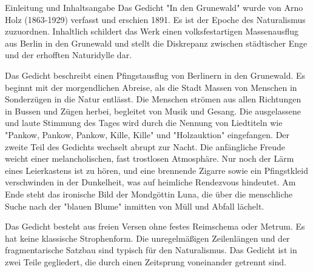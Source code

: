 \documentclass[11pt,a4paper,oneside]{article}
\begin{document}
	\begin{loesung}{Einleitung und Inhaltsangabe}
		Das Gedicht "In den Grunewald" wurde von Arno Holz (1863-1929) verfasst und erschien 1891. Es ist der Epoche des Naturalismus zuzuordnen. Inhaltlich schildert das Werk einen volksfestartigen Massenausflug aus Berlin in den Grunewald und stellt die Diskrepanz zwischen städtischer Enge und der erhofften Naturidylle dar.
		
		Das Gedicht beschreibt einen Pfingstausflug von Berlinern in den Grunewald. Es beginnt mit der morgendlichen Abreise, als die Stadt Massen von Menschen in Sonderzügen in die Natur entlässt. Die Menschen strömen aus allen Richtungen in Bussen und Zügen herbei, begleitet von Musik und Gesang. Die ausgelassene und laute Stimmung des Tages wird durch die Nennung von Liedtiteln wie "Pankow, Pankow, Pankow, Kille, Kille" und "Holzauktion" eingefangen. Der zweite Teil des Gedichts wechselt abrupt zur Nacht. Die anfängliche Freude weicht einer melancholischen, fast trostlosen Atmosphäre. Nur noch der Lärm eines Leierkastens ist zu hören, und eine brennende Zigarre sowie ein Pfingstkleid verschwinden in der Dunkelheit, was auf heimliche Rendezvous hindeutet. Am Ende steht das ironische Bild der Mondgöttin Luna, die über die menschliche Suche nach der "blauen Blume" inmitten von Müll und Abfall lächelt.
		
		Das Gedicht besteht aus freien Versen ohne festes Reimschema oder Metrum. Es hat keine klassische Strophenform. Die unregelmäßigen Zeilenlängen und der fragmentarische Satzbau sind typisch für den Naturalismus. Das Gedicht ist in zwei Teile gegliedert, die durch einen Zeitsprung voneinander getrennt sind.
	\end{loesung}
	
	\newpage
	
\end{document}
